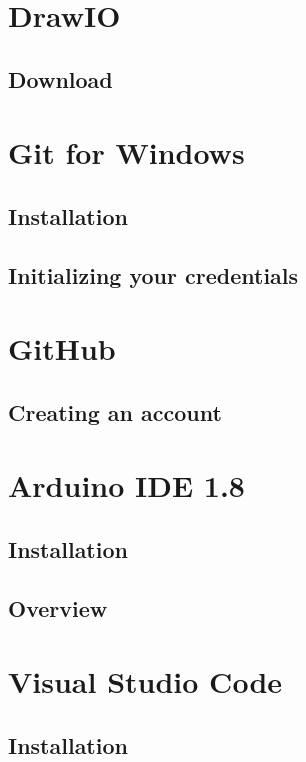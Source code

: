 \section*{DrawIO}

    \subsection*{Download}

\section*{Git for Windows}

    \subsection*{Installation}

    \subsection*{Initializing your credentials}

\section*{GitHub}

    \subsection*{Creating an account}

\section*{Arduino IDE 1.8}

    \subsection*{Installation}

    \subsection*{Overview}

\section*{Visual Studio Code}

    \subsection*{Installation}

